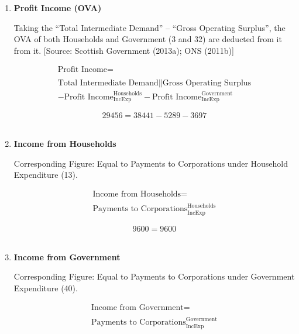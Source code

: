 \begin{enumerate}
\item \textbf {Profit Income (OVA)}

Taking the “Total Intermediate Demand” – “Gross Operating Surplus”, the OVA of both Households and Government (3 and 32) are deducted from it from it. [Source: Scottish Government (2013a); ONS (2011b)]

\begin{equation}
\begin{split}
\text{Profit Income} =  \\ \\
\text{Total Intermediate Demand}\|\text{Gross Operating Surplus}\\
-\text{Profit Income}^\text{Households}_\text{IncExp}-\text{Profit Income}^\text{Government}_\text{IncExp}
\end{split} \label{eq:2.5.23}
\end{equation}

\begin{equation} \nonumber
29456 = 38441-5289-3697
\end{equation}\\


\item \textbf {Income from Households}

Corresponding Figure: Equal to Payments to Corporations under Household Expenditure (13).

\begin{equation}
\begin{split}
\text{Income from Households} =  \\ \\
\text{Payments to Corporations}^\text{Households}_\text{IncExp}
\end{split} \label{eq:2.5.24}
\end{equation}

\begin{equation} \nonumber
9600 = 9600
\end{equation}\\


\item \textbf {Income from Government}

Corresponding Figure: Equal to Payments to Corporations under Government Expenditure (40).

\begin{equation}
\begin{split}
\text{Income from Government} =  \\ \\
\text{Payments to Corporations}^\text{Government}_\text{IncExp}
\end{split} \label{eq:2.5.25}
\end{equation}


\end{enumerate}

